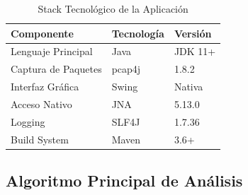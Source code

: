 \documentclass[12pt,a4paper]{article}
\begin{document}
\begin{table}[H]
\centering
\begin{tabular}{|l|l|l|}
\hline
\textbf{Componente} & \textbf{Tecnología} & \textbf{Versión} \\
\hline
Lenguaje Principal & Java & JDK 11+ \\
Captura de Paquetes & pcap4j & 1.8.2 \\
Interfaz Gráfica & Swing & Nativa \\
Acceso Nativo & JNA & 5.13.0 \\
Logging & SLF4J & 1.7.36 \\
Build System & Maven & 3.6+ \\
\hline
\end{tabular}
\caption{Stack Tecnológico de la Aplicación}
\end{table}

\subsection{Algoritmo Principal de Análisis}
\end{document}
